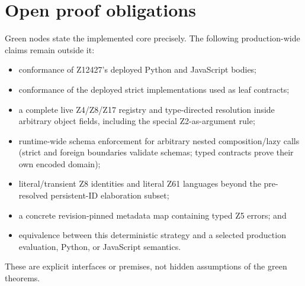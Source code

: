 \chapter*{Open proof obligations}

Green nodes state the implemented core precisely.  The following production-wide claims remain
outside it:
\begin{itemize}
  \item conformance of Z12427's deployed Python and JavaScript bodies;
  \item conformance of the deployed strict implementations used as leaf contracts;
  \item a complete live Z4/Z8/Z17 registry and type-directed resolution inside arbitrary object
        fields, including the special Z2-as-argument rule;
  \item runtime-wide schema enforcement for arbitrary nested composition/lazy calls (strict and
        foreign boundaries validate schemas; typed contracts prove their own encoded domain);
  \item literal/transient Z8 identities and literal Z61 languages beyond the pre-resolved
        persistent-ID elaboration subset;
  \item a concrete revision-pinned metadata map containing typed Z5 errors; and
  \item equivalence between this deterministic strategy and a selected production evaluation,
        Python, or JavaScript semantics.
\end{itemize}
These are explicit interfaces or premises, not hidden assumptions of the green theorems.
